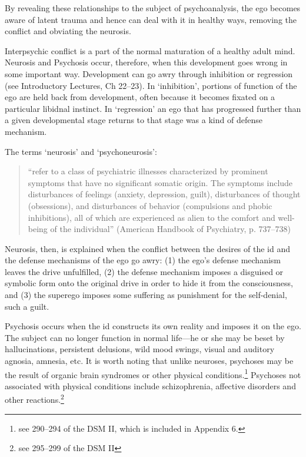 By revealing these relationships to the subject of psychoanalysis, the ego becomes aware of latent trauma and hence can deal with it in healthy ways, removing the conflict and obviating the neurosis.

Interpsychic conflict is a part of the normal maturation of a healthy adult mind. Neurosis and Psychosis occur, therefore, when this development goes wrong in some important way. Development can go awry through inhibition or regression (see Introductory Lectures, Ch 22--23). In `inhibition', portions of function of the ego are held back from development, often because it becomes fixated on a particular libidnal instinct. In `regression' an ego that has progressed further than a given developmental stage returns to that stage was a kind of defense mechanism.

The terms `neurosis' and `psychoneurosis':

\begin{quote}

“refer to a class of psychiatric illnesses characterized by prominent symptoms that have no significant somatic origin. The symptoms include disturbances of feelings (anxiety, depression, guilt), disturbances of thought (obsessions), and disturbances of behavior (compulsions and phobic inhibitions), all of which are experienced as alien to the comfort and well-being of the individual” (American Handbook of Psychiatry, p. 737--738)
\end{quote}

Neurosis, then, is explained when the conflict between the desires of the id and the defense mechanisms of the ego go awry: (1) the ego's defense mechanism leaves the drive unfulfilled, (2) the defense mechanism imposes a disguised or symbolic form onto the original drive in order to hide it from the consciousness, and (3) the superego imposes some suffering as punishment for the self-denial, such a guilt.

Psychosis occurs when the id constructs its own reality and imposes it on the ego. The subject can no longer function in normal life—he or she may be beset by hallucinations, persistent delusions, wild mood swings, visual and auditory agnosia, amnesia, etc. It is worth noting that unlike neuroses, psychoses may be the result of organic brain syndromes or other physical conditions.\footnote{see 290--294 of the DSM II, which is included in Appendix 6.} Psychoses not associated with physical conditions include schizophrenia, affective disorders and other reactions.\footnote{see 295--299 of the DSM II}

